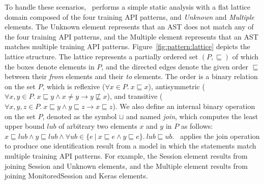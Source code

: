 To handle these scenarios, \tapi~performs a simple static analysis with a flat
lattice domain composed of the four training API patterns, and {\it
Unknown} and {\it Multiple} elements. 
The Unknown element represents that an AST does not match any of the four
training API patterns, and the Multiple element represents that an AST matches
multiple training API patterns.
Figure~\ref{fig:pattern:lattice} depicts the lattice structure.  
The lattice represents a partially ordered set $(P, \sqsubseteq)$ of which the
boxes denote elements in $P$, and the directed edges denote the given order
$\sqsubseteq$ between their {\it from} elements and their {\it to} elements.
The order is a binary relation on the set $P$, which is reflexive ($\forall x
\in P.\ x \sqsubseteq x$), antisymmetric ($\forall x, y \in P.\ x \sqsubseteq y
\wedge x \not= y \to y \not\sqsubseteq x$), and transitive ($\forall x, y, z
\in P.\ x \sqsubseteq y \wedge y \sqsubseteq z \to x \sqsubseteq z$). 
We also define an internal binary operation on the set $P$, denoted as the
symbol $\sqcup$ and named {\it join}, which computes the least upper bound
$lub$ of arbitrary two elements $x$ and $y$ in $P$ as follows: $x \sqsubseteq
lub \wedge y \sqsubseteq lub \wedge \forall ub \in \{e\ |\ x \sqsubseteq e
\wedge y \sqsubseteq e\}.\ lub \sqsubseteq ub$. 
\tapi~applies the join operation to produce one identification result from a
model in which the statements match multiple training API patterns.
For example, the Session element results from joining Session and Unknown
elements, and the Multiple element results from joining MonitoredSession and
Keras elements.


